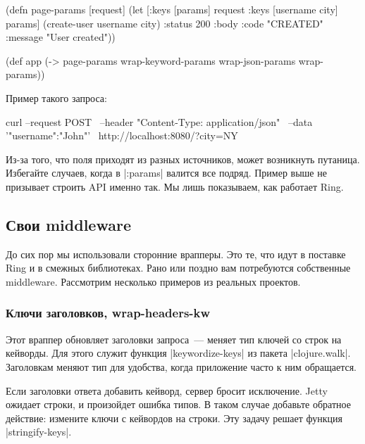 \begin{english}
  \begin{clojure}
(defn page-params [request]
  (let [{:keys [params]} request
        {:keys [username city]} params]
    (create-user username city)
    {:status 200
     :body {:code "CREATED"
            :message "User created"}}))

(def app (-> page-params
             wrap-keyword-params
             wrap-json-params
             wrap-params))
  \end{clojure}
\end{english}

\noindent
Пример такого запроса:

\begin{english}
  \begin{bash}
curl --request POST \
     --header "Content-Type: application/json" \
     --data '{"username":"John"}' \
     http://localhost:8080/?city=NY
  \end{bash}
\end{english}

Из-за того, что поля приходят из разных источников, может возникнуть
путаница. Избегайте случаев, когда в \spverb|:params| валится все подряд. Пример
выше не призывает строить API именно так. Мы лишь показываем, как работает
Ring.

\subsection{Свои middleware}

До сих пор мы использовали сторонние врапперы. Это те, что идут в поставке
Ring и в смежных библиотеках. Рано или поздно вам потребуются
собственные middleware. Рассмотрим несколько примеров из реальных проектов.

\subsubsection*{Ключи заголовков, wrap-headers-kw}

Этот враппер обновляет заголовки запроса~--- меняет тип ключей со строк на
кейворды. Для этого служит функция \spverb|keywordize-keys| из пакета
\spverb|clojure.walk|. Заголовкам меняют тип для удобства, когда приложение
часто к ним обращается.

Если заголовки ответа добавить кейворд, сервер бросит исключение. Jetty ожидает
строки, и произойдет ошибка типов. В таком случае добавьте обратное действие:
измените ключи с кейвордов на строки. Эту задачу решает функция
\spverb|stringify-keys|.

